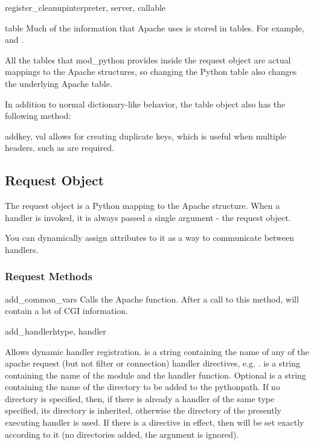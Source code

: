 \begin{funcdesc}{register_cleanup}{interpreter, server, callable}
\begin{classdesc}{table}{}
  Much of the information that Apache uses is stored in tables. For
  example,  and .

  All the tables that mod_python provides inside the request
  object are actual mappings to the Apache structures, so changing the
  Python table also changes the underlying Apache table.

  In addition to normal dictionary-like behavior, the table object also
  has the following method:

  \begin{methoddesc}[table]{add}{key, val}
     allows for creating duplicate keys, which is useful 
    when multiple headers, such as  are required.
  \end{methoddesc}

\end{classdesc}

\subsection{Request Object\label{pyapi-mprequest}}

The request object is a Python mapping to the Apache
 structure. When a handler is invoked, it is always
passed a single argument - the request object. 

You can dynamically assign attributes to it as a way to communicate
between handlers.

\subsubsection{Request Methods\label{pyapi-mprequest-meth}}

\begin{methoddesc}[request]{add_common_vars}{}
  Calls the Apache  function. After a
  call to this method,  will contain a
  lot of CGI information.
\end{methoddesc}

\begin{methoddesc}[request]{add_handler}{htype, handler}

  Allows dynamic handler registration.  is a string
  containing the name of any of the apache request (but not filter or
  connection) handler directives,
  e.g. .  is a string containing the
  name of the module and the handler function.  Optional  is
  a string containing the name of the directory to be added to the
  pythonpath. If no directory is specified, then, if there is already
  a handler of the same type specified, its directory is inherited,
  otherwise the directory of the presently executing handler is
  used. If there is a  directive in effect, then
   will be set exactly according to it (no directories
  added, the  argument is ignored).
  

\end{methoddesc}
\end{funcdesc}

